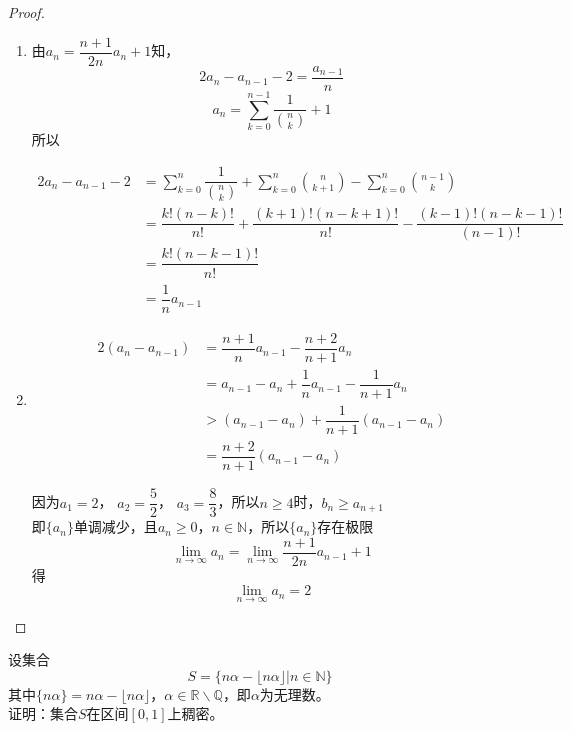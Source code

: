 \begin{proof}

    \begin{enumerate}

        \item 
            由$a_n = \dfrac{n + 1}{2n}a_n + 1$知，
            $$2a_n - a_{n - 1} - 2 = \dfrac{a_{n - 1}}{n}$$
            $$a_n = \sum\limits_{k = 0}^{n - 1}{\dfrac{1}{\binom{n}{k}}} + 1$$
            所以

            \begin{align*}
                2a_n - a_{n - 1} - 2 & = \sum\limits_{k = 0}^{n}{\dfrac{1}{\binom{n}{k}}} + \sum\limits_{k = 0}^{n}{\binom{n}{k + 1}} - \sum\limits_{k = 0}^{n}{\binom{n - 1}{k}} \\
                & = \dfrac{k!(n - k)!}{n!} + \dfrac{(k + 1)!(n - k + 1)!}{n!} - \dfrac{(k - 1)!(n - k - 1)!}{(n - 1)!} \\
                & = \dfrac{k!(n - k - 1)!}{n!} \\
                & = \dfrac{1}{n} a_{n - 1} 
            \end{align*}


        \item 
            \begin{align*}
                2(a_n - a_{n - 1}) & = \dfrac{n + 1}{n}a_{n - 1} - \dfrac{n + 2}{n + 1} a_n \\
                & = a_{n - 1} - a_n + \dfrac{1}{n}a_{n - 1} - \dfrac{1}{n + 1}a_n \\
                & > (a_{n - 1} - a_n) + \dfrac{1}{n + 1}(a_{n - 1} - a_n) \\
                & = \dfrac{n + 2}{n + 1}  (a_{n - 1} - a_n) 
            \end{align*}

            因为$a_1 = 2$， $a_2 = \dfrac{5}{2}$， $a_3 = \dfrac{8}{3}$，所以$n \geq 4$时，$b_n \geq a_{n + 1}$ \\
            即$\{a_n\}$单调减少，且$a_n \geq 0$，$n \in \mathbb{N}$，所以$\{a_n\}$存在极限
            $$\lim\limits_{n \to \infty}{a_n} = \lim\limits_{n \to \infty}{\dfrac{n + 1}{2n}a_{n - 1} + 1}$$
            得
            $$\lim\limits_{n \to \infty}{a_n} = 2$$

    \end{enumerate}

\end{proof}

\begin{lemma}\label{lemma:decimal}

    设集合
    $$S = \{n\alpha - \lfloor n \alpha \rfloor \big| n \in \mathbb{N}\}$$
    其中$\{n\alpha\} = n\alpha - \lfloor n \alpha \rfloor$，$\alpha \in \mathbb{R} \backslash \mathbb{Q}$，即$\alpha$为无理数。\\
    证明：集合$S$在区间$[0, 1]$上稠密。

\end{lemma}

